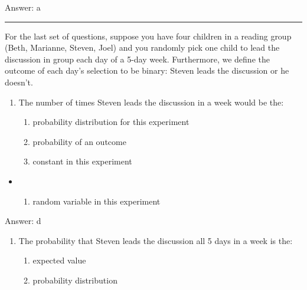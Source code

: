 \documentclass[]{article}
\providecommand{\tightlist}{%
  \setlength{\itemsep}{0pt}\setlength{\parskip}{0pt}}
\begin{document}
Answer: a

\begin{center}\rule{0.5\linewidth}{\linethickness}\end{center}

For the last set of questions, suppose you have four children in a
reading group (Beth, Marianne, Steven, Joel) and you randomly pick one
child to lead the discussion in group each day of a 5-day week.
Furthermore, we define the outcome of each day's selection to be binary:
Steven leads the discussion or he doesn't.

\begin{enumerate}
\def\labelenumi{\arabic{enumi}.}
\setcounter{enumi}{22}
\item
  The number of times Steven leads the discussion in a week would be
  the:

  \begin{enumerate}
  \def\labelenumii{\alph{enumii}.}
  \tightlist
  \item
    probability distribution for this experiment
  \item
    probability of an outcome
  \item
    constant in this experiment
  \end{enumerate}
\end{enumerate}

\begin{itemize}
\item
  \begin{enumerate}
  \def\labelenumi{\alph{enumi}.}
  \setcounter{enumi}{3}
  \tightlist
  \item
    random variable in this experiment
  \end{enumerate}
\end{itemize}

Answer: d

\begin{enumerate}
\def\labelenumi{\arabic{enumi}.}
\setcounter{enumi}{23}
\item
  The probability that Steven leads the discussion all 5 days in a week
  is the:

  \begin{enumerate}
  \def\labelenumii{\alph{enumii}.}
  \tightlist
  \item
    expected value
  \item
    probability distribution
  \end{enumerate}
\end{enumerate}
\end{document}
